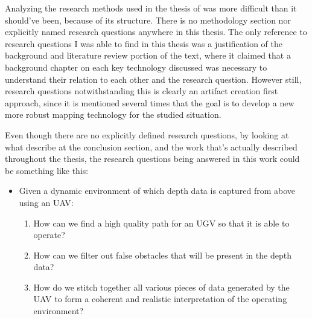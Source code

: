 \documentclass{article}
\begin{document}

	\par Analyzing the research methods used in the thesis of \textcite{T2} 
was more difficult than it should've been, because of its structure. There is 
no methodology section nor explicitly named research questions anywhere in this 
thesis. The only reference to research questions I was able to find in this 
thesis was a justification of the background and literature review portion of 
the text, where it claimed that a background chapter on each key technology 
discussed was necessary to understand their relation to each other and the 
research question.\parencite{T2} However still, research questions 
notwithstanding this is clearly an artifact creation first approach, since it 
is mentioned several times that the goal is to develop a new more robust 
mapping technology for the studied situation.\parencite{T2}


	\par Even though there are no explicitly defined research questions, 
by looking at what \textcite{T2} describe at the conclusion section, and the 
work that's actually described throughout the thesis, the research questions 
being answered in this work could be something like this:

\begin{itemize}
	\item Given a dynamic environment of which depth data is captured from above using an UAV:
	\begin{enumerate}
		\item How can we find a high quality path for an UGV so that it is able to operate?
		\item How can we filter out false obstacles that will be present in the depth data?
		\item How do we stitch together all various pieces of data generated by the UAV to form a coherent and realistic interpretation of the operating environment?
	\end{enumerate}
\end{itemize}
\end{document}

